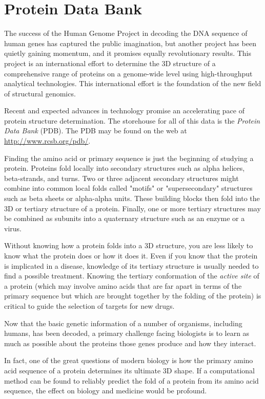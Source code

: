 \chapter{Protein Data Bank}
\label{chap:chapter11}
\minitoc

The success of the Human Genome Project in decoding the DNA sequence of human genes has captured the public imagination, but another project has been quietly gaining momentum, and it promises equally revolutionary results. This project is an international effort to determine the 3D structure of a comprehensive range of proteins on a genome-wide level using high-throughput analytical technologies. This international effort is the foundation of the new field of structural genomics.

Recent and expected advances in technology promise an accelerating pace of protein structure determination. The storehouse for all of this data is the \textit{Protein Data Bank} (PDB). The PDB may be found on the web at \href{http://www.rcsb.org/pdb/}{http://www.rcsb.org/pdb/}.

Finding the amino acid or primary sequence is just the beginning of studying a protein. Proteins fold locally into secondary structures such as alpha helices, beta-strands, and turns. Two or three adjacent secondary structures might combine into common local folds called "motifs" or "supersecondary" structures such as beta sheets or alpha-alpha units. These building blocks then fold into the 3D or tertiary structure of a protein. Finally, one or more tertiary structures may be combined as subunits into a quaternary structure such as an enzyme or a virus.

Without knowing how a protein folds into a 3D structure, you are less likely to know what the protein does or how it does it. Even if you know that the protein is implicated in a disease, knowledge of its tertiary structure is usually needed to find a possible treatment. Knowing the tertiary conformation of the \textit{active site} of a protein (which may involve amino acids that are far apart in terms of the primary sequence but which are brought together by the folding of the protein) is critical to guide the selection of targets for new drugs.

Now that the basic genetic information of a number of organisms, including humans, has been decoded, a primary challenge facing biologists is to learn as much as possible about the proteins those genes produce and how they interact.

In fact, one of the great questions of modern biology is how the primary amino acid sequence of a protein determines its ultimate 3D shape. If a computational method can be found to reliably predict the fold of a protein from its amino acid sequence, the effect on biology and medicine would be profound.

